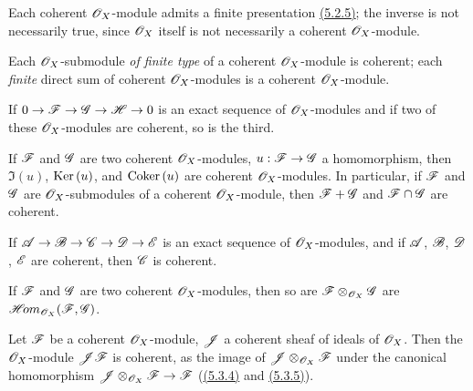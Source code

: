 \begin{env}[5.3.2]
\label{env-0.5.3.2}
Each coherent $\mathscr{O}_X$-module admits a finite presentation \hyperref[env-0.5.2.5]{(5.2.5)}; the inverse is
not necessarily true, since $\mathscr{O}_X$ itself is not necessarily a coherent $\mathscr{O}_X$-module.

Each $\mathscr{O}_X$-submodule {\em of finite type} of a coherent $\mathscr{O}_X$-module is coherent; each
{\em finite} direct sum of coherent $\mathscr{O}_X$-modules is a coherent $\mathscr{O}_X$-module.
\end{env}

\begin{env}[5.3.3]
\label{env-0.5.3.3}
If $0\to\mathscr{F}\to\mathscr{G}\to\mathscr{H}\to 0$ is an exact sequence  of $\mathscr{O}_X$-modules and if two of
these $\mathscr{O}_X$-modules are coherent, so is the third.
\end{env}

\begin{env}[5.3.4]
\label{env-0.5.3.4}
If $\mathscr{F}$ and $\mathscr{G}$ are two coherent $\mathscr{O}_X$-modules, $u:\mathscr{F}\to\mathscr{G}$ a
homomorphism, then $\Im(u)$, ${\mathop{\mathrm{Ker}}\nolimits}\,(u)$, and ${\mathop{\mathrm{Coker}}\nolimits}\,(u)$ are coherent $\mathscr{O}_X$-modules. In
particular, if $\mathscr{F}$ and $\mathscr{G}$ are $\mathscr{O}_X$-submodules of a coherent $\mathscr{O}_X$-module,
then $\mathscr{F}+\mathscr{G}$ and $\mathscr{F}\cap\mathscr{G}$ are coherent.

If $\mathscr{A}\to\mathscr{B}\to\mathscr{C}\to\mathscr{D}\to\mathscr{E}$ is an exact sequence of $\mathscr{O}_X$-modules, and
if $\mathscr{A}$, $\mathscr{B}$, $\mathscr{D}$, $\mathscr{E}$ are coherent, then $\mathscr{C}$ is coherent.
\end{env}

\begin{env}[5.3.5]
\label{env-0.5.3.5}
If $\mathscr{F}$ and $\mathscr{G}$ are two coherent $\mathscr{O}_X$-modules, then so are
$\mathscr{F}\otimes_{\mathscr{O}_X}\mathscr{G}$ are $\mathscr{H}\!{om}_{\mathscr{O}_X}(\mathscr{F},\mathscr{G})$.
\end{env}

\begin{env}[5.3.6]
\label{env-0.5.3.6}
Let $\mathscr{F}$ be a coherent $\mathscr{O}_X$-module, $\mathscr{J}$ a coherent sheaf of ideals of $\mathscr{O}_X$.
Then the $\mathscr{O}_X$-module $\mathscr{J}\mathscr{F}$ is coherent, as the image of
$\mathscr{J}\otimes_{\mathscr{O}_X}\mathscr{F}$ under the canonical homomorphism
$\mathscr{J}\otimes_{\mathscr{O}_X}\mathscr{F}\to\mathscr{F}$ (\hyperref[env-0.5.3.4]{(5.3.4)} and \hyperref[env-0.5.3.5]{(5.3.5)}).
\end{env}

